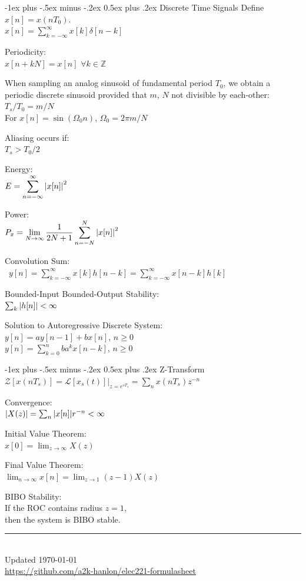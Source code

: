 \documentclass[12pt,landscape,letterpaper]{article}
\makeatletter
\renewcommand{\section}{\@startsection{section}{1}{0mm}%
                                {-1ex plus -.5ex minus -.2ex}%
                                {0.5ex plus .2ex}%
                                {\normalfont\normalsize\bfseries}}
\newcommand{\tabm}{\hspace*{0.07\textwidth}}
\newcommand{\ds}{\displaystyle}
\makeatother
\begin{document}
\begin{minipage}[t]{0.27\textwidth}
\section{Discrete Time Signals}
\tabm Define $x[n] = x(nT_0)$.\\
\tabm $x[n] = \sum_{k=-\infty}^{\infty}x[k]\delta[n-k]$

Periodicity:\\
\tabm $x[n + kN] = x[n]$ \qquad $\forall k\in \mathbb{Z}$

When sampling an analog sinusoid of fundamental period $T_0$, we obtain a periodic discrete sinusoid provided that $m$, $N$ not divisible by each-other:\\
\tabm $T_s/T_0 = m/N$\\
\tabm For $x[n] = \sin{(\Omega_0n)}$, \quad $\Omega_0 = 2\pi m / N$

Aliasing occurs if:\\
\tabm $T_s > T_0/2$

Energy:\\
\tabm $\ds E = \sum_{n = -\infty}^{\infty}\abs{x[n]}^2$

Power:\\
\tabm $\ds P_x = \lim_{N \rightarrow \infty}\frac{1}{2N + 1}\sum_{n= -N}^{N}\abs{x[n]}^2$

Convolution Sum:\\\
\tabm $\ds y[n] = \sum_{k = -\infty}^{\infty} x[k]h[n-k] = \sum_{k = -\infty}^{\infty} x[n-k]h[k]$

Bounded-Input Bounded-Output Stability:\\
\tabm $\sum_k \abs{h[n]} < \infty$

Solution to Autoregressive Discrete System:\\
\tabm $y[n] = ay[n-1] + bx[n]$, $n \geq 0$\\
\tabm $y[n] = \sum_{k=0}^{n} ba^kx[n-k]$, $n\geq 0$

\section{Z-Transform}
\tabm $\mathcal{Z}[x(nT_s)] = \mathcal{L}[x_s(t)]\rvert_{z=e^{sT_s}} = \sum_n x(nT_s)z^{-n}$

Convergence:\\
\tabm $|X(z)| = \sum_n \abs{x[n]}r^{-n} < \infty$

Initial Value Theorem:\\
\tabm $\ds x[0] = \lim_{z\rightarrow \infty}X(z)$

Final Value Theorem:\\
\tabm $\ds \lim_{n\rightarrow \infty}x[n] = \lim_{z\rightarrow 1}(z-1)X(z)$

BIBO Stability:\\
\tabm If the ROC contains radius $z=1$,\\
\tabm then the system is BIBO stable.

\rule{0.3\linewidth}{0.25pt}
\scriptsize\\
Updated \today\\
\href{https://github.com/a2k-hanlon/elec221-formulasheet}{https://github.com/a2k-hanlon/elec221-formulasheet}
\end{minipage}
\end{document}
